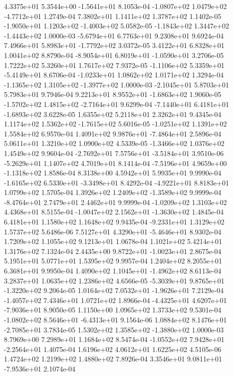  4.3375e+01  5.3544e+00 -1.5641e+01  8.1053e-04
-1.0807e+02  1.0479e+02 -4.7712e+01  1.2749e-04
7.3802e+01 1.1411e+02 1.3787e+02  1.1402e-05
-1.9050e+01  1.1203e+02 -1.4003e+02  5.0582e-05
-1.1843e+02  1.3447e+02 -1.4443e+02  1.0000e-03
-5.6794e+01  6.7763e+01  9.2308e+01  9.6924e-04
 7.4966e+01  5.8983e+01 -1.7792e+02  3.0372e-05
3.4122e+01 6.8328e+01 1.0041e+02  8.8790e-04
-8.9054e+01  6.8019e+01 -1.0590e+01  3.2706e-05
1.7222e+02 5.3260e+01 1.7617e+02  7.9372e-05
-1.1106e+02  5.3359e+01 -5.4149e+01  8.6706e-04
-1.0233e+01  1.0862e+02  1.0171e+02  1.3294e-04
-1.1365e+02  1.3105e+02 -1.3977e+02  1.0000e-03
-2.1045e+01  5.8703e+01  5.7983e+01  9.7946e-04
 9.2213e+01  8.9552e+01 -1.6863e+02  1.9060e-05
-1.5702e+02  1.4815e+02 -2.7164e+01  9.6299e-04
-7.1440e+01  6.4181e+01 -1.6893e+02  3.6228e-05
1.6355e+02 5.2118e+01 2.3262e+01  9.4345e-04
 1.1174e+02  1.5362e+02 -1.7615e+02  5.6016e-05
-1.0251e+02  1.1391e+02  1.5584e+02  6.9570e-04
 1.4091e+02  9.9876e+01 -7.4864e+01  2.5896e-04
5.0611e+01 1.3210e+02 1.0900e+02  4.5339e-05
-1.3466e+02  1.0376e+02  1.4549e+02  9.9604e-04
-2.7692e+01  7.5756e+01 -3.5184e+01  3.9510e-06
-5.2629e+01  1.1407e+02  4.7019e+01  8.1414e-04
-7.5196e+01  4.9659e+00 -1.1318e+02  1.8586e-04
8.3138e+00 4.5942e+01 5.9935e+01  9.9990e-04
-1.6165e+02  6.5330e+01 -3.3498e+01  8.4292e-04
-4.9221e+01  8.8183e+01  1.0799e+02  1.5705e-04
 1.3926e+02  1.2409e+02 -1.3589e+02  9.9999e-04
-8.4764e+01  2.7479e+01  2.4462e+01  9.9999e-04
-1.0209e+02  1.3103e+02  4.4368e+01  8.5155e-04
-1.0047e+02  2.1562e+01 -1.3630e+02  1.4845e-04
6.4181e+01 1.1580e+02 1.1648e+02  9.9435e-04
-9.2331e+01  1.3129e+02  1.5737e+02  5.6486e-06
 7.5127e+01  4.3290e+01 -5.4646e+01  8.9302e-04
1.7209e+02 1.1055e+02 9.1213e+01  1.0678e-04
1.1021e+02 5.4214e+01 1.3176e+02  7.1324e-04
 2.4435e+00  9.8722e+01 -1.0023e+01  2.8675e-04
5.1951e+01 5.0771e+01 1.5395e+02  9.9957e-04
1.2404e+02 8.2055e+01 6.3681e+01  9.9950e-04
 1.4090e+02  1.1045e+01 -1.4962e+02  8.6113e-04
3.2837e+01 1.0635e+02 1.2386e+02  4.6566e-05
-5.3039e+01  9.8765e+01 -1.3220e+02  9.2064e-05
 1.0164e+02  7.0532e+01 -1.9626e+01  7.2129e-04
-1.4057e+02  7.4346e+01  1.0721e+02  1.8966e-04
-4.4325e+01  4.6207e+01 -7.9036e+01  8.9050e-05
1.1150e+00 1.0965e+02 1.3733e+02  9.5301e-04
-1.0802e+02  8.5646e+01 -6.4313e+01  9.1564e-06
 1.0884e+02  8.1476e+01 -2.7085e+01  3.7834e-05
 1.5302e+02  1.3585e+02 -1.3880e+02  1.0000e-03
8.7969e+00 7.2989e+01 1.1684e+02  8.5474e-04
-1.0552e+02  7.9428e+01 -2.2564e+01  1.4075e-04
1.6196e+02 4.0612e+01 1.6225e+02  4.5105e-06
1.4724e+02 1.2199e+02 1.4880e+02  7.8926e-04
 3.3546e+01  9.0811e+01 -7.9536e+01  2.1074e-04
